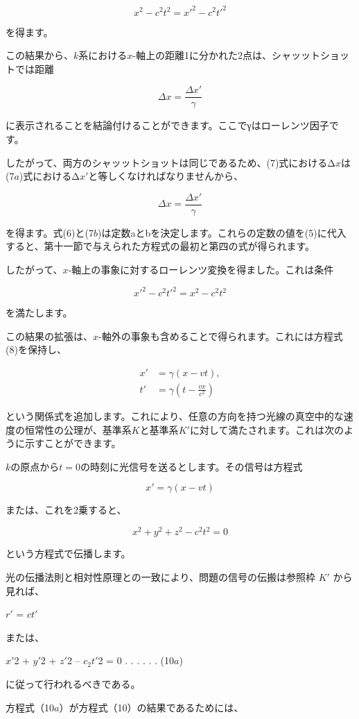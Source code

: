 \documentclass[a4paper,11pt,openany]{ltjsbook}
\begin{document}
\[
x^2 - c^2 t^2 = x'^2 - c^2 t'^2
\]

を得ます。

この結果から、$k$系における$x$-軸上の距離1に分かれた2点は、シャッットショットでは距離

\[
\Delta x = \frac{\Delta x'}{\gamma}
\]

に表示されることを結論付けることができます。ここでγはローレンツ因子です。

したがって、両方のシャッットショットは同じであるため、(7)式におけるΔ$x$は(7$a$)式におけるΔ$x′$と等しくなければなりませんから、

\[
\Delta x = \frac{\Delta x'}{\gamma}
\]

を得ます。式(6)と(7$b$)は定数aとbを決定します。これらの定数の値を(5)に代入すると、第十一節で与えられた方程式の最初と第四の式が得られます。

したがって、$x$-軸上の事象に対するローレンツ変換を得ました。これは条件

\[
x'^2 - c^2 t'^2 = x^2 - c^2 t^2
\]

を満たします。

この結果の拡張は、$x$-軸外の事象も含めることで得られます。これには方程式(8)を保持し、

\[
\begin{aligned}
x' &= \gamma (x - vt), \\
t' &= \gamma \left(t - \frac{vx}{c^2}\right)
\end{aligned}
\]

という関係式を追加します。これにより、任意の方向を持つ光線の真空中的な速度の恒常性の公理が、基準系$K$と基準系$K′$に対して満たされます。これは次のように示すことができます。

$k$の原点から$t = 0$の時刻に光信号を送るとします。その信号は方程式

\[
x' = \gamma (x - vt)
\]

または、これを2乗すると、

\[
x^2 + y^2 + z^2 - c^2 t^2 = 0
\]

という方程式で伝播します。


光の伝播法則と相対性原理との一致により、問題の信号の伝搬は参照枠 $K′$ から見れば、

$r′$ = $ct′$

または、

$x′$2 + $y′$2 + $z′$2 – $c_{2}$$t′$2 = 0 . . . . . . (10$a$)

に従って行われるべきである。

方程式（10$a$）が方程式（10）の結果であるためには、
\end{document}
